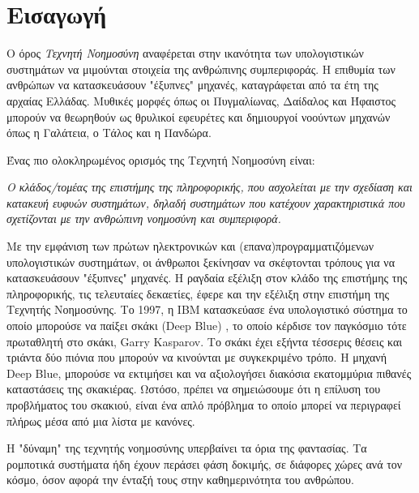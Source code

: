 \chapter{Εισαγωγή}
\label{chapter:intro}

Ο όρος \emph{Τεχνητή Νοημοσύνη} αναφέρεται στην ικανότητα των υπολογιστικών
συστημάτων να μιμούνται στοιχεία της ανθρώπινης συμπεριφοράς.
Η επιθυμία των ανθρώπων να κατασκευάσουν "έξυπνες" μηχανές, καταγράφεται από
τα έτη της αρχαίας Ελλάδας. Μυθικές μορφές όπως οι Πυγμαλίωνας, Δαίδαλος και
Ήφαιστος μπορούν να θεωρηθούν ως θρυλικοί εφευρέτες και δημιουργοί νοούντων
μηχανών όπως η Γαλάτεια, ο Τάλος και η Πανδώρα.

Ένας πιο ολοκληρωμένος ορισμός της Τεχνητή Νοημοσύνη είναι:
\begin{displayquote}
\emph{
  Ο κλάδος/τομέας της επιστήμης της πληροφορικής, που ασχολείται
  με την σχεδίαση και κατακευή ευφυών συστημάτων, δηλαδή συστημάτων που
  κατέχουν χαρακτηριστικά που σχετίζονται με την ανθρώπινη νοημοσύνη και συμπεριφορά.
}
\end{displayquote}
Με την εμφάνιση των πρώτων ηλεκτρονικών και (επανα)προγραμματιζόμενων υπολογιστικών συστημάτων,
οι άνθρωποι ξεκίνησαν να σκέφτονται τρόπους για να κατασκευάσουν "έξυπνες" μηχανές.
H ραγδαία εξέλιξη στον κλάδο της επιστήμης της πληροφορικής, τις τελευταίες
δεκαετίες, έφερε και την εξέλιξη στην επιστήμη της Τεχνητής Νοημοσύνης.
Το 1997, η IBM κατασκεύασε ένα υπολογιστικό σύστημα το οποίο μπορούσε να
παίξει σκάκι (Deep Blue) \cite{campbell2002deep}, το οποίο κέρδισε τον παγκόσμιο
τότε πρωταθλητή στο σκάκι, Garry Kasparov. Το σκάκι έχει εξήντα τέσσερις θέσεις
και τριάντα δύο πιόνια που μπορούν να κινούνται με συγκεκριμένο τρόπο. H μηχανή
Deep Blue, μπορούσε να εκτιμήσει και να αξιολογήσει διακόσια εκατομμύρια
πιθανές καταστάσεις της σκακιέρας. Ωστόσο, πρέπει να σημειώσουμε ότι η επίλυση του
προβλήματος του σκακιού, είναι ένα απλό πρόβλημα το οποίο μπορεί να περιγραφεί
πλήρως μέσα από μια λίστα με κανόνες.

Η "δύναμη" της τεχνητής νοημοσύνης υπερβαίνει τα όρια της φαντασίας.
Τα ρομποτικά συστήματα ήδη έχουν περάσει φάση δοκιμής, σε διάφορες χώρες ανά τον
κόσμο, όσον αφορά την ένταξή τους στην καθημερινότητα του ανθρώπου.


